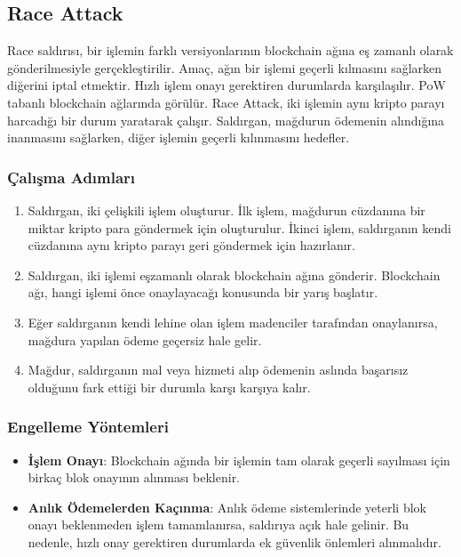 \newpage

\subsection{Race Attack}

Race saldırısı, bir işlemin farklı versiyonlarının blockchain ağına eş zamanlı olarak gönderilmesiyle gerçekleştirilir. Amaç, ağın bir işlemi geçerli kılmasını sağlarken diğerini iptal etmektir. Hızlı işlem onayı gerektiren durumlarda karşılaşılır. PoW tabanlı blockchain ağlarında görülür. Race Attack, iki işlemin aynı kripto parayı harcadığı bir durum yaratarak çalışır. Saldırgan, mağdurun ödemenin alındığına inanmasını sağlarken, diğer işlemin geçerli kılınmasını hedefler.

\subsubsection{Çalışma Adımları}

\begin{enumerate}
    \item Saldırgan, iki çelişkili işlem oluşturur. İlk işlem, mağdurun cüzdanına bir miktar kripto para göndermek için oluşturulur. İkinci işlem, saldırganın kendi cüzdanına aynı kripto parayı geri göndermek için hazırlanır.
    \item Saldırgan, iki işlemi eşzamanlı olarak blockchain ağına gönderir. Blockchain ağı, hangi işlemi önce onaylayacağı konusunda bir yarış başlatır.
    \item Eğer saldırganın kendi lehine olan işlem madenciler tarafından onaylanırsa, mağdura yapılan ödeme geçersiz hale gelir.
    \item Mağdur, saldırganın mal veya hizmeti alıp ödemenin aslında başarısız olduğunu fark ettiği bir durumla karşı karşıya kalır.
\end{enumerate}

\subsubsection{Engelleme Yöntemleri}

\begin{itemize}
    \item \textbf{İşlem Onayı}: Blockchain ağında bir işlemin tam olarak geçerli sayılması için birkaç blok onayının alınması beklenir.
    \item \textbf{Anlık Ödemelerden Kaçınma}: Anlık ödeme sistemlerinde yeterli blok onayı beklenmeden işlem tamamlanırsa, saldırıya açık hale gelinir. Bu nedenle, hızlı onay gerektiren durumlarda ek güvenlik önlemleri alınmalıdır.
\end{itemize}

\newpage